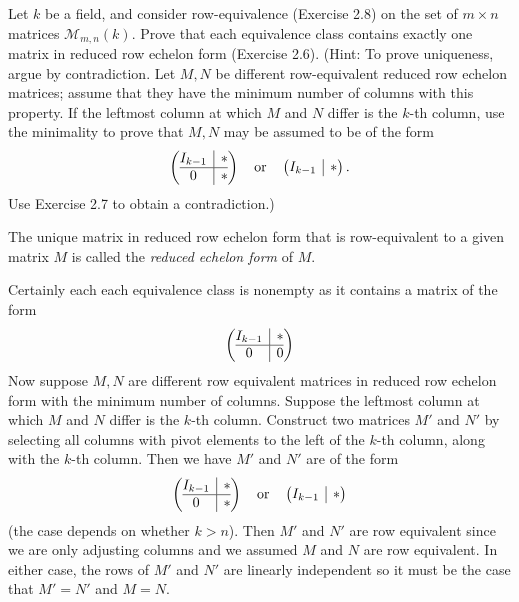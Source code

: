 \documentclass[../../master.tex]{subfiles}
\begin{document}
\begin{problem}
    Let $k$ be a field, and consider row-equivalence (Exercise 2.8) on the set of $m \times n$ matrices $\mathcal{M}_{m, n}(k)$.
    Prove that each equivalence class contains exactly one matrix in reduced row echelon form (Exercise 2.6).
    (Hint: To prove uniqueness, argue by contradiction.
    Let $M, N$ be different row-equivalent reduced row echelon matrices;
    assume that they have the minimum number of columns with this property.
    If the leftmost column at which $M$ and $N$ differ is the $k$-th column, use the minimality to prove that $M, N$ may be assumed to be of the form
    \[
        \left(
            \begin{array}{@{}c|c@{}}
                I_{k-1} & * \\
                \hline
                0 & *
            \end{array}
        \right) \quad \text{or} \quad
        \left(
            \begin{array}{@{}c|c@{}}
                I_{k-1} & *
            \end{array}
        \right).
    \]
    Use Exercise 2.7 to obtain a contradiction.)

    The unique matrix in reduced row echelon form that is row-equivalent to a given matrix $M$ is called the \textit{reduced echelon form} of $M$.
\end{problem}

\begin{solution}
    Certainly each each equivalence class is nonempty as it contains a matrix of the form
    \[
    \left(
        \begin{array}{@{}c|c@{}}
            I_{k-1} & * \\
            \hline
            0 & 0
        \end{array}
    \right)
    \]
    Now suppose $M, N$ are different row equivalent matrices in reduced row echelon form with the minimum number of columns.
    Suppose the leftmost column at which $M$ and $N$ differ is the $k$-th column.
    Construct two matrices $M'$ and $N'$ by selecting all columns with pivot elements to the left of the $k$-th column, along with the $k$-th column.
    Then we have $M'$ and $N'$ are of the form
    \[
        \left(
            \begin{array}{@{}c|c@{}}
                I_{k-1} & * \\
                \hline
                0 & *
            \end{array}
        \right) \quad \text{or} \quad
        \left(
            \begin{array}{@{}c|c@{}}
                I_{k-1} & *
            \end{array}
        \right)
    \]
    (the case depends on whether $k > n$).
    Then $M'$ and $N'$ are row equivalent since we are only adjusting columns and we assumed $M$ and $N$ are row equivalent.
    In either case, the rows of $M'$ and $N'$ are linearly independent so it must be the case that $M' = N'$ and $M = N$.
\end{solution}
\end{document}
